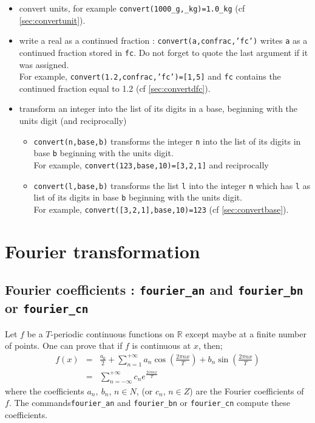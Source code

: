 \documentclass[a4paper,11pt]{book}
\begin{document}
\begin{itemize}
\item convert units, for example 
{\tt convert(1000\_g,\_kg)=1.0\_kg} (cf \ref{sec:convertunit}).
\item write a real as a continued fraction  : 
{\tt convert(a,confrac,'fc')} writes {\tt a} as a continued fraction
stored in {\tt fc}. Do not forget to quote the last argument if it
was assigned.\\
For example, {\tt convert(1.2,confrac,'fc')=[1,5]} and  {\tt fc} contains the 
continued fraction equal to 1.2 (cf \ref{sec:convertdfc}). 
\item  transform an integer into the list of its digits in a 
base, beginning with the units digit (and reciprocally)
\begin{itemize}
\item
{\tt convert(n,base,b)} transforms the integer {\tt n} into the list of its 
digits in base {\tt b} beginning with the units digit.\\ For example,
{\tt convert(123,base,10)=[3,2,1]} and  reciprocally
\item
{\tt convert(l,base,b)} transforms the list {\tt l} into the integer {\tt n} 
which has {\tt l} as list of its 
digits in base {\tt b} beginning with the units digit.\\ For example, 
{\tt convert([3,2,1],base,10)=123} (cf \ref{sec:convertbase}). 
\end{itemize}
\end{itemize}

\section{Fourier transformation}
\subsection{Fourier coefficients : {\tt fourier\_an} and  {\tt fourier\_bn} or {\tt fourier\_cn}} 
Let $f$ be a $T$-periodic continuous functions on
$\mathbb{R}$ except maybe at a finite number of points.
One can prove that if $f$ is continuous at $x$, then;
\begin{eqnarray*}
f(x)&=&\frac{a_0}{2}+\sum _{n=1}^{+\infty} a_n \cos(\frac{2\pi
  nx}{T})+b_n \sin(\frac{2\pi nx}{T}) \\
 &=&\sum _{n=-\infty}^{+\infty} c_n e^{\frac{2i\pi nx}{T}}
\end{eqnarray*}
where the coefficients $a_n,\ b_n$, $n\in N$, (or $c_n$, $n \in Z$) are the 
Fourier coefficients of $f$.
The commands{\tt fourier\_an} and {\tt fourier\_bn} or {\tt fourier\_cn} 
compute these coefficients.  
\end{document}
